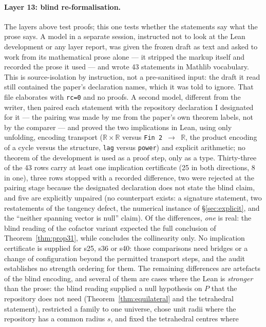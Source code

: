 \documentclass[11pt]{article}
\theoremstyle{definition}
\theoremstyle{remark}
\newcommand{\RR}{\mathbb{R}}
\begin{document}
\paragraph{Layer 13: blind re-formalisation.} The layers above test proofs; this one tests whether the
statements say what the prose says. A model in a separate session, instructed not to look at the Lean
development or any layer report, was given the frozen draft as text and asked to work from its
mathematical prose alone --- it stripped the markup itself and recorded the prose it used --- and
wrote 43 statements in Mathlib vocabulary. This is source-isolation by instruction, not a
pre-sanitised input: the draft it read still contained the paper's declaration names, which it was
told to ignore. That file elaborates with \texttt{rc=0} and no proofs.
A second model, different from the writer, then paired each statement with the repository declaration
I designated for it --- the pairing was made by me from the paper's own theorem labels, not by the
comparer --- and proved the two implications in Lean, using only unfolding, encoding transport
($\RR\times\RR$ versus \texttt{Fin 2 $\to$ $\RR$}, the product encoding of a cycle versus the
structure, \texttt{lag} versus \texttt{power}) and explicit arithmetic; no theorem of the
development is used as a proof step, only as a type. Thirty-three of the 43 rows carry at least one
implication certificate (25 in both directions, 8 in one), three rows stopped with a recorded
difference, two were rejected at the pairing stage because the designated declaration does not state
the blind claim, and five are explicitly unpaired (no counterpart exists: a signature statement, two
restatements of the tangency defect, the numerical instance of \S\ref{sec:explicit}, and the
``neither spanning vector is null'' claim). Of the differences, \emph{one} is real: the blind reading
of the cofactor variant expected the full conclusion of Theorem~\ref{thm:prop31}, while
 concludes the collinearity only. No implication certificate is
supplied for s25, s36 or s40: those comparisons need bridges or a change of configuration beyond the
permitted transport steps, and the audit establishes no strength ordering for them. The remaining
differences are artefacts of the blind encoding, and several of them are cases where the Lean is
\emph{stronger} than
the prose: the blind reading supplied a null hypothesis on $P$ that the repository does not need
(Theorem~\ref{thm:equilateral} and the tetrahedral statement), restricted a family to one universe,
chose unit radii where the repository has a common radius $s$, and fixed the tetrahedral centres where
\end{document}
